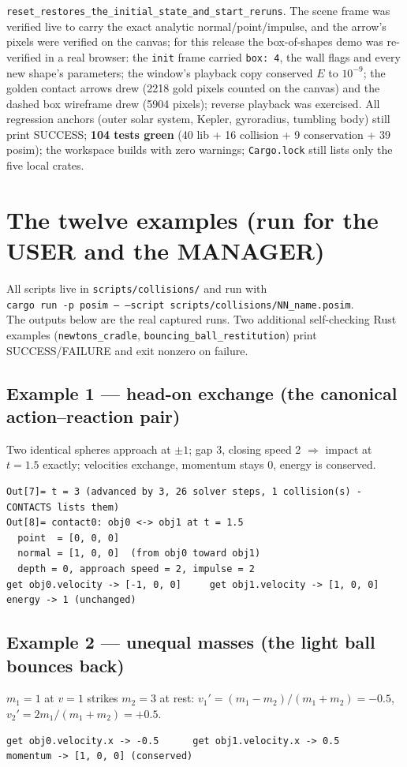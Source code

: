 \documentclass[11pt]{article}
\newcommand{\code}[1]{\texttt{#1}}
\begin{document}
\code{reset\_restores\_the\_initial\_state\_and\_start\_reruns}. The scene
frame was verified
live to carry the exact analytic normal/point/impulse, and the arrow's
pixels were verified on the canvas; for this release the box-of-shapes demo
was re-verified in a real browser: the \code{init} frame carried
\code{box: 4}, the wall flags and every new shape's parameters; the window's
playback copy conserved $E$ to $10^{-9}$; the golden contact arrows drew
(2218 gold pixels counted on the canvas) and the dashed box wireframe drew
(5904 pixels); reverse playback was exercised. All regression anchors (outer
solar system, Kepler, gyroradius, tumbling body) still print SUCCESS;
\textbf{104 tests green} (40 lib + 16 collision + 9 conservation +
39 posim); the workspace builds with zero warnings; \code{Cargo.lock} still
lists only the five local crates.

\section{The twelve examples (run for the USER and the MANAGER)}

All scripts live in \code{scripts/collisions/} and run with\\
\code{cargo run -p posim -- --script scripts/collisions/NN\_name.posim}.\\
The outputs below are the real captured runs. Two additional self-checking Rust
examples (\code{newtons\_cradle}, \code{bouncing\_ball\_restitution}) print
SUCCESS/FAILURE and exit nonzero on failure.

\subsection{Example 1 --- head-on exchange (the canonical action--reaction pair)}
Two identical spheres approach at $\pm 1$; gap 3, closing speed 2 $\Rightarrow$
impact at $t = 1.5$ exactly; velocities exchange, momentum stays 0, energy is
conserved.
\begin{lstlisting}
Out[7]= t = 3 (advanced by 3, 26 solver steps, 1 collision(s) - CONTACTS lists them)
Out[8]= contact0: obj0 <-> obj1 at t = 1.5
  point  = [0, 0, 0]
  normal = [1, 0, 0]  (from obj0 toward obj1)
  depth = 0, approach speed = 2, impulse = 2
get obj0.velocity -> [-1, 0, 0]     get obj1.velocity -> [1, 0, 0]
energy -> 1 (unchanged)
\end{lstlisting}

\subsection{Example 2 --- unequal masses (the light ball bounces back)}
$m_1 = 1$ at $v = 1$ strikes $m_2 = 3$ at rest:
$v_1' = (m_1{-}m_2)/(m_1{+}m_2) = -0.5$,
$v_2' = 2m_1/(m_1{+}m_2) = +0.5$.
\begin{lstlisting}
get obj0.velocity.x -> -0.5      get obj1.velocity.x -> 0.5
momentum -> [1, 0, 0] (conserved)
\end{lstlisting}
\end{document}
